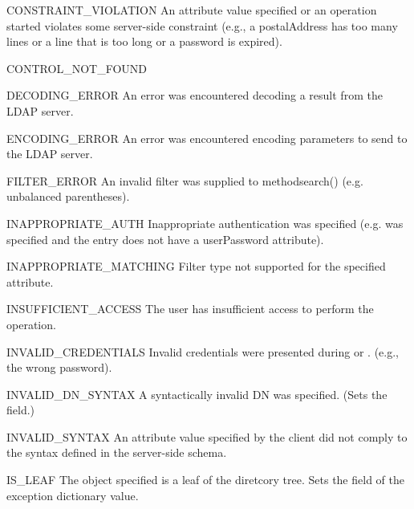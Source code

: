 \begin{excdesc}{CONSTRAINT_VIOLATION}
An attribute value specified or an operation started violates some
server-side constraint
(e.g., a postalAddress has too many lines or a line that is too long
or a password is expired).
\end{excdesc}
\begin{excdesc}{CONTROL_NOT_FOUND}

\end{excdesc}
\begin{excdesc}{DECODING_ERROR}
An error was encountered decoding a result from the LDAP server.
\end{excdesc}
\begin{excdesc}{ENCODING_ERROR}
An error was encountered encoding parameters to send to the LDAP server.
\end{excdesc}
\begin{excdesc}{FILTER_ERROR}
An invalid filter was supplied to method{search()}
(e.g. unbalanced parentheses).
\end{excdesc}
\begin{excdesc}{INAPPROPRIATE_AUTH}
Inappropriate authentication was specified (e.g. 
was specified and the entry does not have a userPassword attribute).
\end{excdesc}
\begin{excdesc}{INAPPROPRIATE_MATCHING}
Filter type not supported for the specified attribute.
\end{excdesc}
\begin{excdesc}{INSUFFICIENT_ACCESS}
The user has insufficient access to perform the operation.
\end{excdesc}
\begin{excdesc}{INVALID_CREDENTIALS}
Invalid credentials were presented during  or
.
(e.g., the wrong password).
\end{excdesc}
\begin{excdesc}{INVALID_DN_SYNTAX}
A syntactically invalid DN was specified. (Sets the  field.)
\end{excdesc}
\begin{excdesc}{INVALID_SYNTAX}
An attribute value specified by the client did not comply to the
syntax defined in the server-side schema.
\end{excdesc}
\begin{excdesc}{IS_LEAF}
The object specified is a leaf of the diretcory tree.
Sets the  field of the exception dictionary value.
\end{excdesc}
